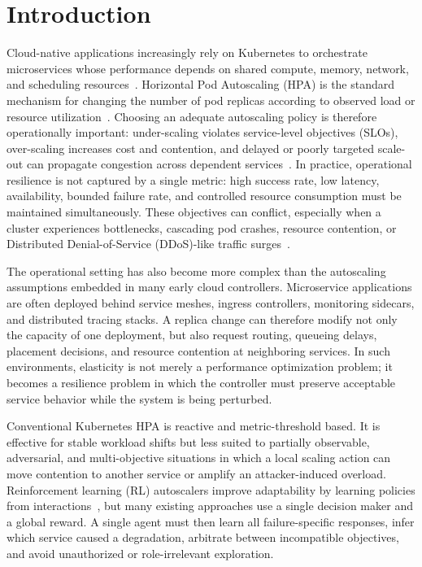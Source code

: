 \documentclass[journal]{IEEEtran}
\begin{document}
\section{Introduction}
\label{sec:introduction}

Cloud-native applications increasingly rely on Kubernetes to orchestrate microservices whose performance depends on shared compute, memory, network, and scheduling resources~\cite{Pahl2019}. Horizontal Pod Autoscaling (HPA) is the standard mechanism for changing the number of pod replicas according to observed load or resource utilization~\cite{Toka2020}. Choosing an adequate autoscaling policy is therefore operationally important: under-scaling violates service-level objectives (SLOs), over-scaling increases cost and contention, and delayed or poorly targeted scale-out can propagate congestion across dependent services~\cite{Santos2025Gwydion}. In practice, operational resilience is not captured by a single metric: high success rate, low latency, availability, bounded failure rate, and controlled resource consumption must be maintained simultaneously. These objectives can conflict, especially when a cluster experiences bottlenecks, cascading pod crashes, resource contention, or Distributed Denial-of-Service (DDoS)-like traffic surges~\cite{David2021,burns2016borg}.

The operational setting has also become more complex than the autoscaling assumptions embedded in many early cloud controllers. Microservice applications are often deployed behind service meshes, ingress controllers, monitoring sidecars, and distributed tracing stacks. A replica change can therefore modify not only the capacity of one deployment, but also request routing, queueing delays, placement decisions, and resource contention at neighboring services. In such environments, elasticity is not merely a performance optimization problem; it becomes a resilience problem in which the controller must preserve acceptable service behavior while the system is being perturbed.

Conventional Kubernetes HPA is reactive and metric-threshold based. It is effective for stable workload shifts but less suited to partially observable, adversarial, and multi-objective situations in which a local scaling action can move contention to another service or amplify an attacker-induced overload. Reinforcement learning (RL) autoscalers improve adaptability by learning policies from interactions~\cite{Gari2021,Mishra2024CloudRL}, but many existing approaches use a single decision maker and a global reward. A single agent must then learn all failure-specific responses, infer which service caused a degradation, arbitrate between incompatible objectives, and avoid unauthorized or role-irrelevant exploration.
\end{document}
